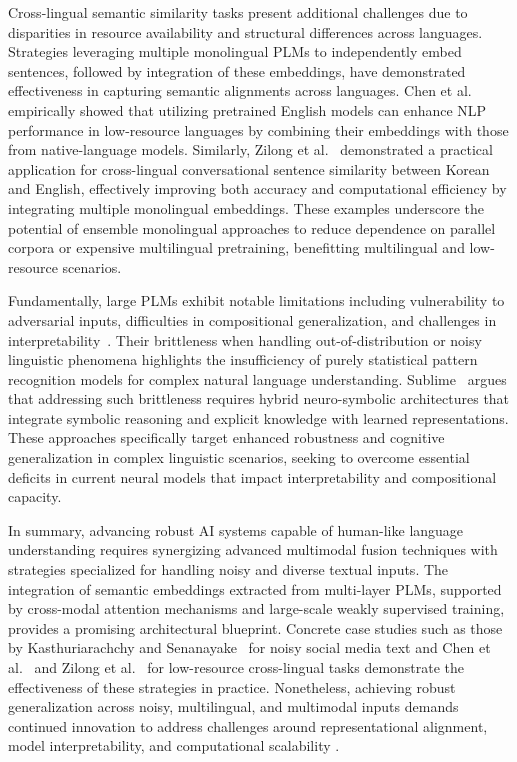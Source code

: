 \documentclass[sigconf]{acmart}
\begin{document}
Cross-lingual semantic similarity tasks present additional challenges due to disparities in resource availability and structural differences across languages. Strategies leveraging multiple monolingual PLMs to independently embed sentences, followed by integration of these embeddings, have demonstrated effectiveness in capturing semantic alignments across languages. Chen et al.~\cite{ref31} empirically showed that utilizing pretrained English models can enhance NLP performance in low-resource languages by combining their embeddings with those from native-language models. Similarly, Zilong et al.~\cite{ref38} demonstrated a practical application for cross-lingual conversational sentence similarity between Korean and English, effectively improving both accuracy and computational efficiency by integrating multiple monolingual embeddings. These examples underscore the potential of ensemble monolingual approaches to reduce dependence on parallel corpora or expensive multilingual pretraining, benefitting multilingual and low-resource scenarios.

Fundamentally, large PLMs exhibit notable limitations including vulnerability to adversarial inputs, difficulties in compositional generalization, and challenges in interpretability~\cite{ref7}. Their brittleness when handling out-of-distribution or noisy linguistic phenomena highlights the insufficiency of purely statistical pattern recognition models for complex natural language understanding. Sublime~\cite{ref7} argues that addressing such brittleness requires hybrid neuro-symbolic architectures that integrate symbolic reasoning and explicit knowledge with learned representations. These approaches specifically target enhanced robustness and cognitive generalization in complex linguistic scenarios, seeking to overcome essential deficits in current neural models that impact interpretability and compositional capacity.

In summary, advancing robust AI systems capable of human-like language understanding requires synergizing advanced multimodal fusion techniques with strategies specialized for handling noisy and diverse textual inputs. The integration of semantic embeddings extracted from multi-layer PLMs, supported by cross-modal attention mechanisms and large-scale weakly supervised training, provides a promising architectural blueprint. Concrete case studies such as those by Kasthuriarachchy and Senanayake~\cite{ref37} for noisy social media text and Chen et al.~\cite{ref31} and Zilong et al.~\cite{ref38} for low-resource cross-lingual tasks demonstrate the effectiveness of these strategies in practice. Nonetheless, achieving robust generalization across noisy, multilingual, and multimodal inputs demands continued innovation to address challenges around representational alignment, model interpretability, and computational scalability \cite{ref1,ref2,ref3,ref4,ref5,ref6,ref7,ref12,ref28,ref31,ref32,ref37,ref38}.
\end{document}

